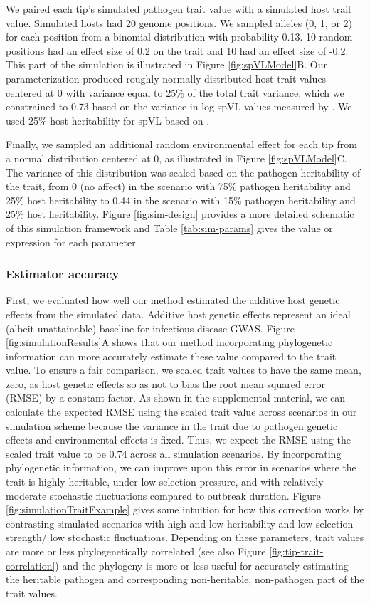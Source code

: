 \documentclass[11pt]{article}
\begin{document}
\begin{linenumbers}
We paired each tip's simulated pathogen trait value with a simulated host trait value. Simulated hosts had 20 genome positions. We sampled alleles (0, 1, or 2) for each position from a binomial distribution with probability 0.13. 10 random positions had an effect size of 0.2 on the trait and 10 had an effect size of -0.2. This part of the simulation is illustrated in Figure \ref{fig:spVLModel}B. Our parameterization produced roughly normally distributed host trait values centered at 0 with variance equal to 25\% of the total trait variance, which we constrained to 0.73 based on the variance in log spVL values measured by \cite{Mitov2018}. We used 25\% host heritability for spVL based on \cite{McLaren2015}.

Finally, we sampled an additional random environmental effect for each tip from a normal distribution centered at 0, as illustrated in Figure \ref{fig:spVLModel}C. The variance of this distribution was scaled based on the pathogen heritability of the trait, from 0 (no affect) in the scenario with 75\% pathogen heritability and 25\% host heritability to 0.44 in the scenario with 15\% pathogen heritability and 25\% host heritability. Figure \ref{fig:sim-design} provides a more detailed schematic of this simulation framework and Table \ref{tab:sim-params} gives the value or expression for each parameter.

\subsubsection*{Estimator accuracy}

First, we evaluated how well our method estimated the additive host genetic effects from the simulated data. Additive host genetic effects represent an ideal (albeit unattainable) baseline for infectious disease GWAS. Figure \ref{fig:simulationResults}A shows that our method incorporating phylogenetic information can more accurately estimate these value compared to the trait value. To ensure a fair comparison, we scaled trait values to have the same mean, zero, as host genetic effects so as not to bias the root mean squared error (RMSE) by a constant factor. As shown in the supplemental material, we can calculate the expected RMSE using the scaled trait value across scenarios in our simulation scheme because the variance in the trait due to pathogen genetic effects and environmental effects is fixed. Thus, we expect the RMSE using the scaled trait value to be 0.74 across all simulation scenarios. By incorporating phylogenetic information, we can improve upon this error in scenarios where the trait is highly heritable, under low selection pressure, and with relatively moderate stochastic fluctuations compared to outbreak duration. Figure \ref{fig:simulationTraitExample} gives some intuition for how this correction works by contrasting simulated scenarios with high and low heritability and low selection strength/ low stochastic fluctuations. Depending on these parameters, trait values are more or less phylogenetically correlated (see also Figure \ref{fig:tip-trait-correlation}) and the phylogeny is more or less useful for accurately estimating the heritable pathogen and corresponding non-heritable, non-pathogen part of the trait values. 


\end{linenumbers}
\end{document}
